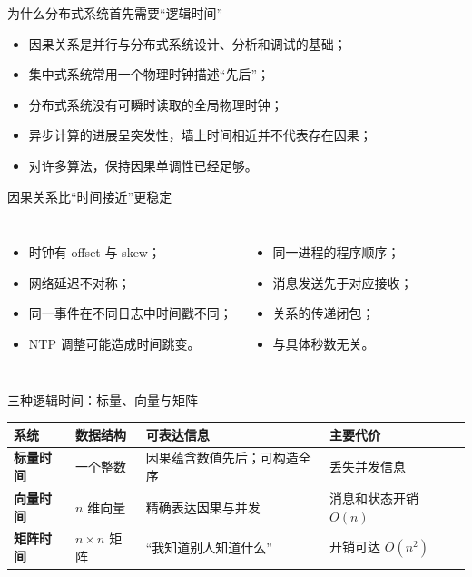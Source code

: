 \documentclass[UTF8,fontset=none,aspectratio=169,10pt]{beamer}
\begin{document}

\begin{frame}{为什么分布式系统首先需要“逻辑时间”}
\begin{itemize}
  \item 因果关系是并行与分布式系统设计、分析和调试的基础；
  \item 集中式系统常用一个物理时钟描述“先后”；
  \item 分布式系统没有可瞬时读取的全局物理时钟；
  \item 异步计算的进展呈突发性，墙上时间相近并不代表存在因果；
  \item 对许多算法，保持因果单调性已经足够。
\end{itemize}
\vfill
{}
\end{frame}

\begin{frame}{因果关系比“时间接近”更稳定}
\begin{columns}[T,onlytextwidth]
\begin{itemize}
  \item 时钟有 offset 与 skew；
  \item 网络延迟不对称；
  \item 同一事件在不同日志中时间戳不同；
  \item NTP 调整可能造成时间跳变。
\end{itemize}
\begin{itemize}
  \item 同一进程的程序顺序；
  \item 消息发送先于对应接收；
  \item 关系的传递闭包；
  \item 与具体秒数无关。
\end{itemize}
\end{columns}
\vfill
{}
\end{frame}

\begin{frame}{三种逻辑时间：标量、向量与矩阵}
\begin{tabularx}{\linewidth}{>{\bfseries}p{2.4cm}XXX}
\toprule
系统 & 数据结构 & 可表达信息 & 主要代价 \\
\midrule
标量时间 & 一个整数 & 因果蕴含数值先后；可构造全序 & 丢失并发信息 \\
向量时间 & $n$ 维向量 & 精确表达因果与并发 & 消息和状态开销 $O(n)$ \\
矩阵时间 & $n\times n$ 矩阵 & “我知道别人知道什么” & 开销可达 $O(n^2)$ \\
\bottomrule
\end{tabularx}
\vfill
{}
\end{frame}
\end{document}
